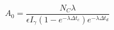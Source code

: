 \begin{equation} \label{eq:Final_Expression_A0}
    A_0 = \frac{N_C \lambda }{\epsilon I_\gamma (1-e^{-\lambda \Delta t_c})e^{-\lambda \Delta t_d}}
\end{equation}

